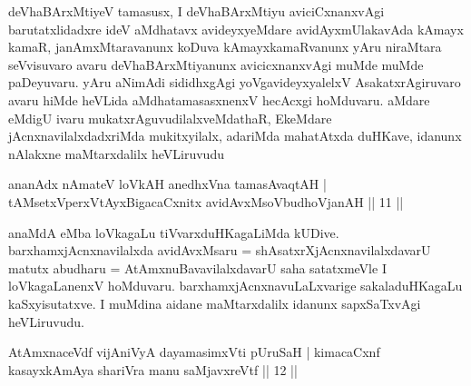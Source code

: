 
\begin{artha}
 deVhaBArxMtiyeV tamasusx, I deVhaBArxMtiyu aviciCxnanxvAgi barutatxlidadxre ideV aMdhatavx avideyxyeMdare avidAyxmUlakavAda kAmayx kamaR, janAmxMtaravanunx koDuva kAmayxkamaRvanunx yAru niraMtara seVvisuvaro avaru deVhaBArxMtiyanunx avicicxnanxvAgi muMde muMde paDeyuvaru. yAru aNimAdi sididhxgAgi yoVgavideyxyalelxV AsakatxrAgiruvaro avaru hiMde heVLida aMdhatamasasxnenxV hecAcxgi hoMduvaru. aMdare eMdigU ivaru mukatxrAguvudilalxveMdathaR, EkeMdare jAcnxnavilalxdadxriMda mukitxyilalx, adariMda mahatAtxda duHKave, idanunx nAlakxne maMtarxdalilx heVLiruvudu\ndash  
\end{artha}

\begin{shl}
ananAdx nAmateV loVkAH anedhxVna tamasAvaqtAH |\\
tAMsetxVperxVtAyxBigacaCxnitx avidAvxMsoV\s budhoVjanAH || 11 ||
\end{shl}

\begin{artha} %
anaMdA eMba loVkagaLu tiVvarxduHKagaLiMda kUDive. barxhamxjAcnxnavilalxda avidAvxMsaru = shAsatxrXjAcnxnavilalxdavarU matutx abudharu = AtAmxnuBavavilalxdavarU saha satatxmeVle I loVkagaLanenxV hoMduvaru. barxhamxjAcnxnavuLaLxvarige sakaladuHKagaLu kaSxyisutatxve. I muMdina aidane maMtarxdalilx idanunx sapxSaTxvAgi heVLiruvudu. \ndash 
\end{artha}

\begin{shl}
AtAmxnaceVdf vijAniVyA dayamasimxVti pUruSaH |
kimacaCxnf kasayxkAmAya shariVra manu saMjavxreVtf || 12 ||
\end{shl}

